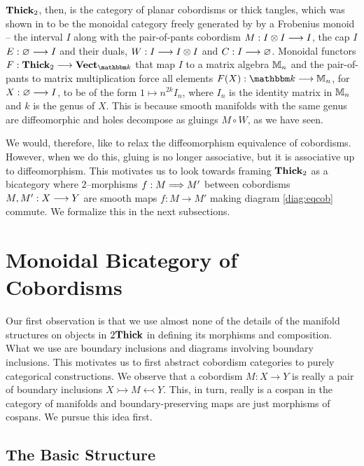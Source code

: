 \documentclass[./Thick_TQFTs_and_Quantum_Information.tex]{subfiles}
\begin{document}
$\textbf{Thick}_2$, then, is the category of planar cobordisms or thick tangles, which
was shown in \cite{NonCommTQFT} to be the monoidal category freely generated by
by a Frobenius monoid -- the interval $I$ along with the pair-of-pants cobordism
$M : I \otimes I \stackrel{}{\longrightarrow} I$, the cap $I$ $E : \varnothing \stackrel{}{\longrightarrow} I$ and their duals,
$W : I \stackrel{}{\longrightarrow} I \otimes I$ and $C : I \stackrel{}{\longrightarrow} \varnothing$. Monoidal functors
$F : \Thick_2 \to \Vect_{\K}$ that map $I$ to a matrix algebra $\mathbb{M}_n$
and the pair-of-pants to matrix multiplication force all elements
$F(X) : \K \to \M_n$, for $X : \varnothing \stackrel{}{\longrightarrow} I$, to be of the form
$1 \mapsto n^{2k}I_n$, where $I_n$ is the identity matrix in $\mathbb{M}_n$ and $k$ is
the genus of $X$. This is because smooth manifolds with the same genus are
diffeomorphic and holes decompose as gluings $M \circ W$, as we have seen.

We would, therefore, like to relax the diffeomorphism equivalence of cobordisms.
However, when we do this, gluing is no longer associative, but it is associative
up to diffeomorphism.  This motivates us to look towards framing $\textbf{Thick}_2$ as a
bicategory where $2$--morphisms $f : M \stackrel{}{\Longrightarrow} M'$ between cobordisms $M,
M' : X \stackrel{}{\longrightarrow} Y$ are smooth maps $f : M \to M'$ making diagram \eqref{diag:eqcob}
commute. We formalize this in the next subsections.

\section{Monoidal Bicategory of Cobordisms}

Our first observation is that we use almost none of the details of the manifold
structures on objects in $2\textbf{Thick}$ in defining its morphisms and composition.
What we use are boundary inclusions and diagrams involving boundary inclusions.
This motivates us to first abstract cobordism categories to purely categorical
constructions. We observe that a cobordism $M : X \to Y$ is really a pair of
boundary inclusions $X \rightarrowtail M \leftarrowtail Y$. This, in turn,
really is a cospan in the category of manifolds and boundary-preserving maps are
just morphisms of cospans. We pursue this idea first.

\subsection{The Basic Structure}
\end{document}
